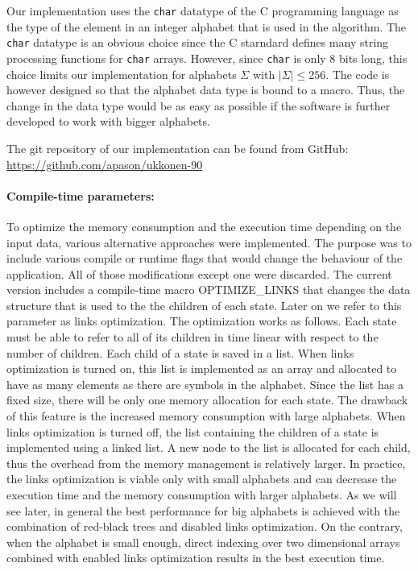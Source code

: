 \documentclass[english,twoside,censored,csm,algorithms-track-2020]{HYthesisML}
\theoremstyle{plain}
\theoremstyle{definition}
\begin{document}
Our implementation uses the \texttt{char} datatype of the C programming language as the
type of the element
in an integer alphabet that is used in the algorithm. The \texttt{char} datatype is an obvious
choice since the C starndard defines many string processing functions for \texttt{char} arrays.
However, since \texttt{char} is only 8 bits long, this choice limits our implementation for alphabets
$\Sigma$ with $|\Sigma| \leq 256$. The code is however designed so that the alphabet data type
is bound to a macro. Thus, the change in the
data type would be as easy as possible if the software is further developed to work with
bigger alphabets. 

The git repository of our implementation can be found from GitHub:\\ \url{https://github.com/apason/ukkonen-90}

\paragraph{Compile-time parameters:}
To optimize the memory consumption and the execution time depending on the input data,
various alternative approaches were implemented.
The purpose was to include various compile or runtime flags that would change the behaviour
of the application. All of those modifications except one were discarded. The current version includes
a compile-time macro OPTIMIZE\_LINKS that changes the data structure that is used to the the children of each
state. Later on we refer to this parameter as links optimization. The optimization works as follows.
Each state must be able to refer to all of its children in time linear with respect to the number
of children.
Each child of a state is saved in a list. When links optimization is turned on, this list is
implemented as an array and allocated
to have as many elements as there are symbols in the alphabet. Since the list has a fixed size, there
will be only one memory allocation for each state. The drawback of this feature is the increased memory
consumption with large alphabets. When links optimization is turned off, the list containing the
children of a state is implemented using a linked list. A new node to the list is allocated for each
child, thus the overhead from the memory management is relatively larger. In practice, the links
optimization is viable only with small alphabets and can decrease the execution time and the memory
consumption with larger alphabets. As we will see later, in general the best performance for big
alphabets
is achieved with the combination of red-black trees and disabled links optimization. On the contrary,
when the alphabet is small enough, direct indexing over two dimensional arrays combined with
enabled links
optimization results in the best execution time.
\end{document}
